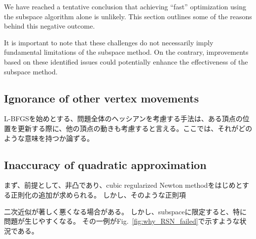 \documentclass[dvipdfmx,lettersize,journal]{IEEEtran}
\begin{document}
We have reached a tentative conclusion that achieving ``fast'' optimization using the subspace algorithm alone is unlikely.
This section outlines some of the reasons behind this negative outcome.

It is important to note that these challenges do not necessarily imply fundamental limitations of the subspace method. On the contrary, improvements based on these identified issues could potentially enhance the effectiveness of the subspace method.

\subsection{Ignorance of other vertex movements}\label{ssec:ignorance}

L-BFGSを始めとする、問題全体のヘッシアンを考慮する手法は、ある頂点の位置を更新する際に、他の頂点の動きも考慮すると言える。ここでは、それがどのような意味を持つか論ずる。

\subsection{Inaccuracy of quadratic approximation}\label{ssec:inaccuracy}

まず、前提として、非凸であり、cubic regularized Newton methodをはじめとする正則化の追加が求められる。
しかし、そのような正則項

二次近似が著しく悪くなる場合がある。
しかし、subspaceに限定すると、特に問題が生じやすくなる。
その一例がFig.~\ref{fig:why_RSN_failed}で示すような状況である。
\end{document}
